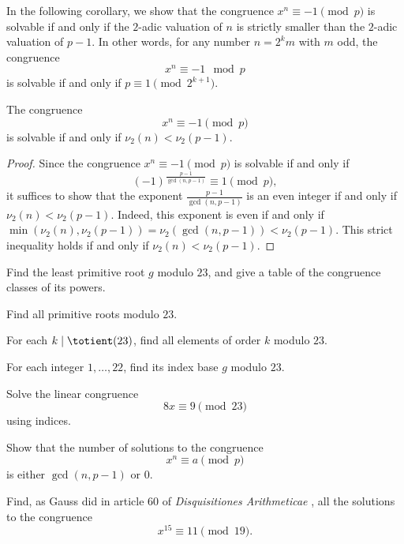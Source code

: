 In the following corollary, we show that the congruence $x^n\equiv -1\pmod{p}$ is solvable if and only if the $2$-adic valuation of $n$ is strictly smaller than the $2$-adic valuation of $p-1$. In other words, for any number $n=2^km$ with $m$ odd, the congruence
\begin{equation*}
  x^{n}\equiv -1\mod{p}
\end{equation*}
is solvable if and only if $p\equiv 1\pmod{2^{k+1}}$. 

\begin{corollary}
  The congruence
  \begin{equation*}
    x^n\equiv -1\pmod{p}
  \end{equation*}
  is solvable if and only if $\nu_2(n)<\nu_2(p-1)$. 
\end{corollary}

\begin{proof}
  Since the congruence $x^n\equiv -1\pmod{p}$ is solvable if and only if
  \begin{equation*}
    (-1)^{\frac{p-1}{\gcd(n,p-1)}}\equiv 1\pmod{p},
  \end{equation*}
  it suffices to show that the exponent $\frac{p-1}{\gcd(n,p-1)}$ is an even integer if and only if $\nu_2(n)<\nu_2(p-1)$. Indeed, this exponent is even if and only if $\min(\nu_2(n),\nu_2(p-1))=\nu_2(\gcd(n,p-1))<\nu_2(p-1)$. This strict inequality holds if and only if $\nu_2(n)<\nu_2(p-1)$.
\end{proof}

\exercises

\begin{starter}
  \exercise
  \begin{subexenum}
  \item Find the least primitive root $g$ modulo $23$, and give a table of the congruence classes of its powers.
  \item Find all primitive roots modulo $23$.
  \item For each $k\mid\totient(23)$, find all elements of order $k$ modulo $23$.
  \item For each integer $1,\ldots,22$, find its index base $g$ modulo $23$.
  \item Solve the linear congruence
    \begin{equation*}
      8x\equiv 9\pmod{23}
    \end{equation*}
    using indices.
  \end{subexenum}
  \exercise
  \begin{subexenum}
  \item Show that the number of solutions to the congruence
    \begin{equation*}
      x^n\equiv a\pmod{p}
    \end{equation*}
    is either $\gcd(n,p-1)$ or $0$.
  \item Find, as Gauss did in article 60 of \emph{Disquisitiones Arithmeticae} \cite{gauss1986}, all the solutions to the congruence
    \begin{equation*}
      x^{15}\equiv 11\pmod{19}.
    \end{equation*}
  \end{subexenum}
\end{starter}

